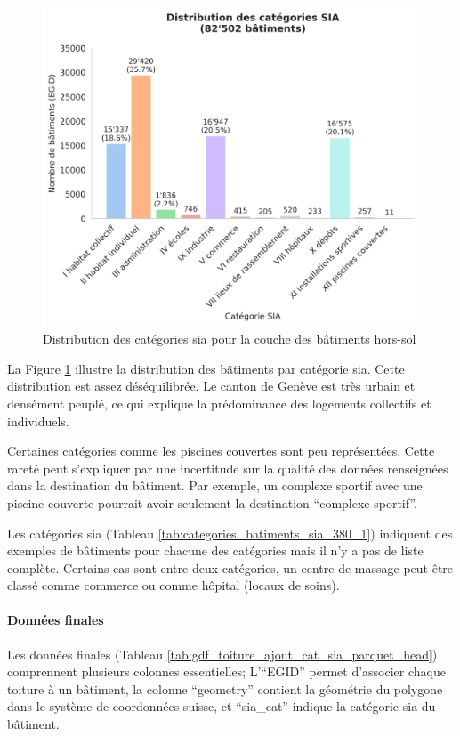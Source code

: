 \begin{figure}[H]
    \centering
    \includegraphics[width=1\linewidth]{02-main//figures//ch3/ch3_preparation_donnees_categorie_sia_01_barplot.png}
    \caption{Distribution des catégories \gls{sia} pour la couche des bâtiments hors-sol}
    \label{fig:ch3_preparation_donnees_categorie_sia_01_barplot}
\end{figure}

La Figure \ref{fig:ch3_preparation_donnees_categorie_sia_01_barplot} illustre la distribution des bâtiments par catégorie \gls{sia}. Cette distribution est assez déséquilibrée. Le canton de Genève est très urbain et densément peuplé, ce qui explique la prédominance des logements collectifs et individuels.

Certaines catégories comme les piscines couvertes sont peu représentées. Cette rareté peut s'expliquer par une incertitude sur la qualité des données renseignées dans la destination du bâtiment. Par exemple, un complexe sportif avec une piscine couverte pourrait avoir seulement la destination ``complexe sportif''.

Les catégories \gls{sia} (Tableau \ref{tab:categories_batiments_sia_380_1}) indiquent des exemples de bâtiments pour chacune des catégories mais il n'y a pas de liste complète. Certains cas sont entre deux catégories, un centre de massage peut être classé comme commerce ou comme hôpital (locaux de soins).

\paragraph{Données finales}
Les données finales (Tableau \ref{tab:gdf_toiture_ajout_cat_sia_parquet_head}) comprennent plusieurs colonnes essentielles; L'``EGID'' permet d'associer chaque toiture à un bâtiment, la colonne ``geometry'' contient la géométrie du polygone dans le système de coordonnées suisse, et ``sia\_cat'' indique la catégorie \gls{sia} du bâtiment. 

